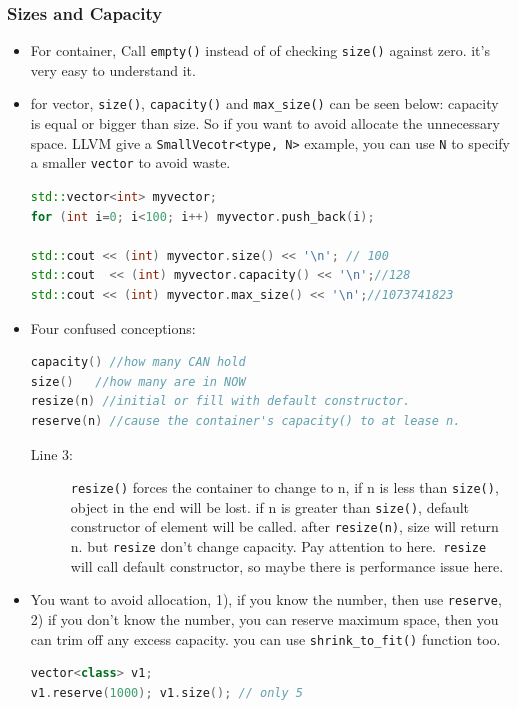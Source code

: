\documentclass[a4paper,11pt,twoside]{book}
\begin{document}
\subsubsection{Sizes and Capacity}
\begin{itemize}
	\item For container, Call \texttt{empty()} instead of of checking \texttt{size()} against zero. it's very easy to understand it.
	
	\item for vector, \texttt{size()}, \texttt{capacity()} and \texttt{max\_size()} can be seen below: capacity is equal or bigger than size. So if you want to avoid allocate the unnecessary space.  LLVM give a \texttt{SmallVecotr<type, N>} example, you can use \texttt{N} to specify a smaller \texttt{vector} to avoid waste.
\begin{lstlisting}[frame=single, language=c++]
std::vector<int> myvector;
for (int i=0; i<100; i++) myvector.push_back(i);

std::cout << (int) myvector.size() << '\n'; // 100
std::cout  << (int) myvector.capacity() << '\n';//128
std::cout << (int) myvector.max_size() << '\n';//1073741823
\end{lstlisting}	
	
	
	\item Four confused conceptions:
\begin{lstlisting}[frame=single, language=c++]
capacity() //how many CAN hold
size()   //how many are in NOW
resize(n) //initial or fill with default constructor.
reserve(n) //cause the container's capacity() to at lease n.
\end{lstlisting}	
	\begin{description}
		\item[Line 3:] \texttt{resize()} forces the container to change to n, if n is less than \texttt{size()},  object in the end will be lost. if n is greater than \texttt{size()},  default constructor of element will be called. after \texttt{resize(n)}, size will return n. but \texttt{resize} don't change capacity. Pay attention to here.\texttt{ resize} will call default constructor, so maybe there is performance issue here. 
	\end{description}
	
	\item You want to avoid allocation, 1), if you know the number, then use \texttt{reserve}, 2) if you don't know the number, you can reserve maximum space, then you can trim off any excess capacity.  you can use \texttt{shrink\_to\_fit()} function too. 
\begin{lstlisting}[frame=single, language=c++]
vector<class> v1;
v1.reserve(1000); v1.size(); // only 5


\end{lstlisting}
\end{itemize}
\end{document}
